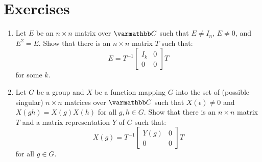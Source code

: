 \chapter*{Exercises}

\begin{exercise}
	\phantom{a}
	\mbox{}
	\begin{enumerate}[label = (\alph*),itemsep=1pt,topsep=3pt]
		\item Let $E$ be an $n \times n$ matrix over $\bfC$ such that $E \neq I_n$, $E \neq 0$, and $E^2 = E$. Show that there is an $n \times n$ matrix $T$ such that:
			\[
				E = T^{-1} \begin{bmatrix} I_k & 0 \\ 0 & 0 \end{bmatrix} T
			\]
		for some $k$.

		\item Let $G$ be a group and $X$ be a function mapping $G$ into the set of (possible singular) $n \times n$ matrices over $\bfC$ such that $X(\epsilon) \neq 0$ and $X(gh) = X(g)X(h)$ for all $g,h \in G$. Show that there is an $n \times n$ matrix $T$ and a matrix representation $Y$ of $G$ such that:
			\[
				X(g) = T^{-1} \begin{bmatrix} Y(g) & 0 \\ 0 & 0  \end{bmatrix} T
			\] 
			for all $g \in G$.
	\end{enumerate}
\end{exercise}
